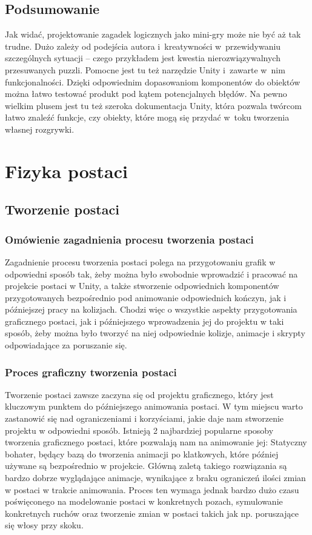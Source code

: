 \documentclass[oneside,polski,logo]{amuthesis}
\begin{document}
\section{Podsumowanie}
\par Jak widać, projektowanie zagadek logicznych jako mini-gry może nie być aż tak trudne. Dużo zależy od podejścia autora i~kreatywności w~przewidywaniu szczególnych sytuacji – czego przykładem jest kwestia nierozwiązywalnych przesuwanych puzzli. Pomocne jest tu też narzędzie Unity i~zawarte w~nim funkcjonalności. Dzięki odpowiednim dopasowaniom komponentów do obiektów można łatwo testować produkt pod kątem potencjalnych błędów. Na pewno wielkim plusem jest tu też szeroka dokumentacja Unity, która pozwala twórcom łatwo znaleźć funkcje, czy obiekty, które mogą się przydać w~toku tworzenia własnej rozgrywki.

\chapter{Fizyka postaci}
\section{Tworzenie postaci}
\subsection{Omówienie zagadnienia procesu tworzenia postaci}
Zagadnienie procesu tworzenia postaci polega na przygotowaniu grafik w odpowiedni sposób tak, żeby można było swobodnie wprowadzić i pracować na projekcie postaci w Unity, a także stworzenie odpowiednich komponentów przygotowanych bezpośrednio pod animowanie odpowiednich kończyn, jak i późniejszej pracy na kolizjach. Chodzi więc o wszystkie aspekty przygotowania graficznego postaci, jak i późniejszego wprowadzenia jej do projektu w taki sposób, żeby można było tworzyć na niej odpowiednie kolizje, animacje i skrypty odpowiadające za poruszanie się.
\subsection{Proces graficzny tworzenia postaci}
Tworzenie postaci zawsze zaczyna się od projektu graficznego, który jest kluczowym punktem do późniejszego animowania postaci. W tym miejscu warto zastanowić się nad ograniczeniami i korzyściami, jakie daje nam stworzenie projektu w odpowiedni sposób. Istnieją 2 najbardziej popularne sposoby tworzenia graficznego postaci, które pozwalają nam na animowanie jej:
Statyczny bohater, będący bazą do tworzenia animacji po klatkowych, które później używane są bezpośrednio w projekcie. Główną zaletą takiego rozwiązania są bardzo dobrze wyglądające animacje, wynikające z braku ograniczeń ilości zmian w postaci w trakcie animowania.
Proces ten wymaga jednak bardzo dużo czasu poświęconego na modelowanie postaci w konkretnych pozach, symulowanie konkretnych ruchów oraz tworzenie zmian w postaci takich jak np. poruszające się włosy przy skoku.
\end{document}
